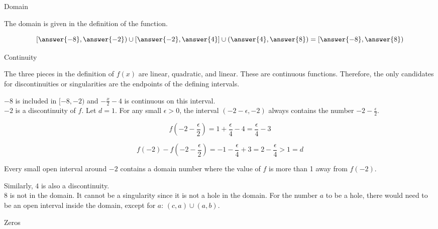 \documentclass{ximera}
\begin{document}
\begin{exercise}
\begin{question} Domain


The domain is given in the definition of the function.

\[
\left[ \answer{-8}, \answer{-2} \right) \cup \left[  \answer{-2}, \answer{4} \right] \cup \left(  \answer{4}, \answer{8} \right) = \left[ \answer{-8}, \answer{8} \right)
\]


\end{question}







\begin{question} Continuity


The three pieces in the definition of $f(x)$ are linear, quadratic, and linear.  These are continuous functions.  Therefore, the only candidates for discontinuities or singularities are the endpoints of the defining intervals.

$-8$ is included in $[-8, -2)$ and $-\frac{x}{2} - 4$ is continuous on this interval. \\

$-2$ is a discontinuity of $f$.  Let $d = 1$. For any small $\epsilon > 0$, the interval $(-2 - \epsilon, -2)$ always contains the number $-2 - \frac{\epsilon}{2}$.  


\[
f\left( -2 - \frac{\epsilon}{2} \right) = 1 + \frac{\epsilon}{4} - 4 =  \frac{\epsilon}{4} - 3
\]


\[
f(-2) - f\left( -2 - \frac{\epsilon}{2} \right) = -1 - \frac{\epsilon}{4} + 3 = 2 - \frac{\epsilon}{4} > 1 = d
\]


Every small open interval around $-2$ contains a domain number where the value of $f$ is more than 1 away from $f(-2)$.





Similarly, $4$ is also a discontinuity.  \\



$8$ is not in the domain.  It cannot be a singularity since it is not a hole in the domain.  For the number $a$ to be a hole, there would need to be an open interval inside the domain, except for $a$:  $(c, a) \cup (a, b)$. 


\end{question}





\begin{question} Zeros



\end{question}
\end{exercise}
\end{document}
